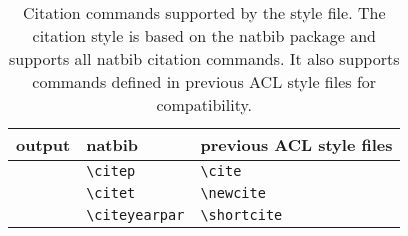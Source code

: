 \documentclass[11pt,a4paper]{article}
\newcommand\BibTeX{B{\sc ib}\TeX}
\begin{document}



\begin{table*}
\centering
\begin{tabular}{lll}
  output & natbib & previous ACL style files\\
  \hline
  \citep{Gusfield:97} & \verb|\citep| & \verb|\cite| \\
  \citet{Gusfield:97} & \verb|\citet| & \verb|\newcite| \\
  \citeyearpar{Gusfield:97} & \verb|\citeyearpar| & \verb|\shortcite| \\
\end{tabular}
\caption{Citation commands supported by the style file.
  The citation style is based on the natbib package and
  supports all natbib citation commands.
  It also supports commands defined in previous ACL style files
  for compatibility.
  }
\end{table*}
\end{document}
